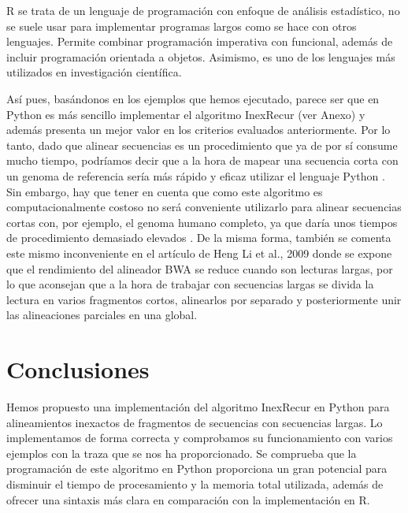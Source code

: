 \documentclass{article}
\begin{document}
R se trata de un lenguaje de  programación  con  enfoque  de  análisis
estadístico, no se suele usar para implementar programas  largos  como
se hace con otros lenguajes.  Permite combinar programación imperativa
con funcional, además de incluir  programación	orientada  a  objetos.
Asimismo, es uno de los  lenguajes  más  utilizados  en  investigación
científica. \cite{bellosta_2018,kleiber_zeileis_2008}

Así pues, basándonos en los ejemplos que hemos ejecutado,  parece  ser
que en Python es más sencillo implementar el algoritmo InexRecur  (ver
Anexo) y además presenta un mejor valor en los  criterios  evaluados
anteriormente.	Por lo	tanto,	dado  que  alinear  secuencias	es  un
procedimiento que ya de por sí consume mucho tiempo,  podríamos  decir
que a la  hora	de  mapear  una  secuencia  corta  con	un  genoma  de
referencia sería más rápido  y	eficaz	utilizar  el  lenguaje	Python
\cite{amigo_2015}.  Sin embargo, hay que tener en cuenta que como este
algoritmo es computacionalmente costoso no será conveniente utilizarlo
para alinear secuencias cortas con,  por  ejemplo,  el	genoma	humano
completo,  ya  que  daría  unos  tiempos  de  procedimiento  demasiado
elevados \cite{Houtgast2015}.  De la misma forma, también  se  comenta
este mismo inconveniente en el	artículo  de  Heng  Li	et  al.,  2009
\cite{li_durbin_2009} donde se expone que el rendimiento del alineador
BWA se reduce cuando son lecturas largas, por lo que aconsejan	que  a
la hora de trabajar con secuencias largas  se  divida  la  lectura  en
varios fragmentos cortos, alinearlos  por  separado  y	posteriormente
unir las alineaciones parciales en una global.

\vspace{-1cm}
\section{Conclusiones}
\vspace{-0.25cm}

Hemos propuesto una implementación del algoritmo InexRecur  en	Python
para  alineamientos  inexactos	de  fragmentos	 de   secuencias   con
secuencias largas. Lo implementamos de forma correcta y comprobamos su
funcionamiento con  varios  ejemplos  con  la  traza  que  se  nos  ha
proporcionado.	Se comprueba que la programación de este algoritmo  en
Python proporciona un gran  potencial  para  disminuir	el  tiempo  de
procesamiento y la memoria total  utilizada,  además  de  ofrecer  una
sintaxis  más  clara  en  comparación  con  la	implementación	en  R.
\end{document}
